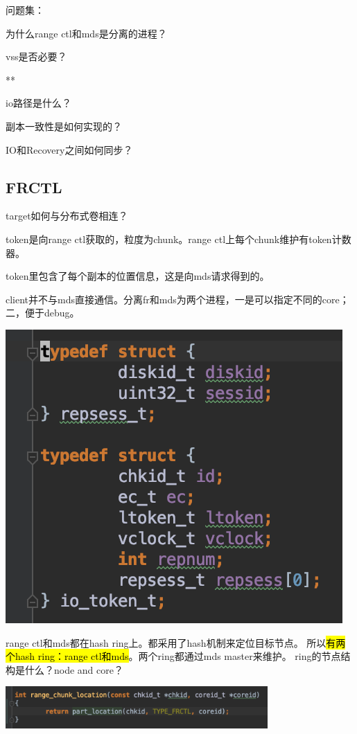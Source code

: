 问题集：
\begin{enumbox}
\item 为什么range ctl和mds是分离的进程？
\item vss是否必要？
\item ***
\item io路径是什么？
\item 副本一致性是如何实现的？
\item IO和Recovery之间如何同步？
\end{enumbox}

\subsection{FRCTL}

target如何与分布式卷相连？

token是向range ctl获取的，粒度为chunk。range ctl上每个chunk维护有token计数器。

token里包含了每个副本的位置信息，这是向mds请求得到的。

client并不与mds直接通信。分离fr和mds为两个进程，一是可以指定不同的core；二，便于debug。

\begin{center}
\includegraphics{../imgs/token.png}
\end{center}

range ctl和mds都在hash ring上。都采用了hash机制来定位目标节点。
所以\hl{有两个hash ring：range ctl和mds}。两个ring都通过mds master来维护。
ring的节点结构是什么？node and core？
\begin{center}
\includegraphics[width=10cm]{../imgs/chunk-location.png}
\end{center}

